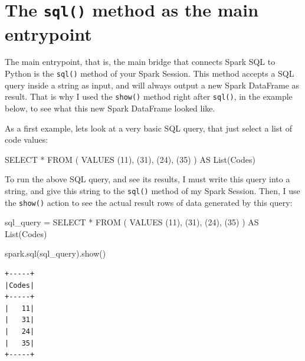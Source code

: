 \documentclass[
  11pt,
  letterpaper,
  DIV=11,
  numbers=noendperiod]{scrreprt}
\newenvironment{Shaded}{\begin{snugshade}}{\end{snugshade}}
\newcommand{\DecValTok}[1]{\textcolor[rgb]{0.68,0.00,0.00}{#1}}
\newcommand{\KeywordTok}[1]{\textcolor[rgb]{0.00,0.23,0.31}{#1}}
\newcommand{\NormalTok}[1]{\textcolor[rgb]{0.00,0.23,0.31}{#1}}
\newcommand{\OperatorTok}[1]{\textcolor[rgb]{0.37,0.37,0.37}{#1}}
\newcommand{\StringTok}[1]{\textcolor[rgb]{0.13,0.47,0.30}{#1}}
\begin{document}
\hypertarget{the-sql-method-as-the-main-entrypoint}{%
\section{\texorpdfstring{The \texttt{sql()} method as the main
entrypoint}{The sql() method as the main entrypoint}}\label{the-sql-method-as-the-main-entrypoint}}

The main entrypoint, that is, the main bridge that connects Spark SQL to
Python is the \texttt{sql()} method of your Spark Session. This method
accepts a SQL query inside a string as input, and will always output a
new Spark DataFrame as result. That is why I used the \texttt{show()}
method right after \texttt{sql()}, in the example below, to see what
this new Spark DataFrame looked like.

As a first example, lets look at a very basic SQL query, that just
select a list of code values:

\begin{Shaded}
\begin{Highlighting}[]
\KeywordTok{SELECT} \OperatorTok{*}
\KeywordTok{FROM}\NormalTok{ (}
  \KeywordTok{VALUES}\NormalTok{ (}\DecValTok{11}\NormalTok{), (}\DecValTok{31}\NormalTok{), (}\DecValTok{24}\NormalTok{), (}\DecValTok{35}\NormalTok{)}
\NormalTok{) }\KeywordTok{AS} \KeywordTok{List}\NormalTok{(Codes)}
\end{Highlighting}
\end{Shaded}

To run the above SQL query, and see its results, I must write this query
into a string, and give this string to the \texttt{sql()} method of my
Spark Session. Then, I use the \texttt{show()} action to see the actual
result rows of data generated by this query:

\begin{Shaded}
\begin{Highlighting}[]
\NormalTok{sql\_query }\OperatorTok{=} \StringTok{\textquotesingle{}\textquotesingle{}\textquotesingle{}}
\StringTok{SELECT *}
\StringTok{FROM (}
\StringTok{  VALUES (11), (31), (24), (35)}
\StringTok{) AS List(Codes)}
\StringTok{\textquotesingle{}\textquotesingle{}\textquotesingle{}}

\NormalTok{spark.sql(sql\_query).show()}
\end{Highlighting}
\end{Shaded}

\begin{verbatim}
+-----+
|Codes|
+-----+
|   11|
|   31|
|   24|
|   35|
+-----+
\end{verbatim}
\end{document}
